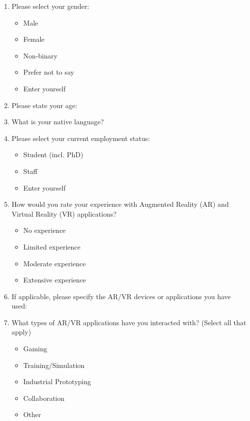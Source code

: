 \begin{enumerate}
    \item Please select your gender:
    \begin{itemize}
        \item Male
        \item Female
        \item Non-binary
        \item Prefer not to say
        \item Enter yourself
    \end{itemize}
    
    \item Please state your age: \underline{\hspace{3cm}}
    
    \item What is your native language? \underline{\hspace{5cm}}
    
    \item Please select your current employment status:
    \begin{itemize}
        \item Student (incl. PhD)
        \item Staff
        \item Enter yourself
    \end{itemize}
    
    \item How would you rate your experience with Augmented Reality (AR) and Virtual Reality (VR) applications?
    \begin{itemize}
        \item No experience
        \item Limited experience
        \item Moderate experience
        \item Extensive experience
    \end{itemize}
    
    \item If applicable, please specify the AR/VR devices or applications you have used: \underline{\hspace{8cm}}
    
    \item What types of AR/VR applications have you interacted with? (Select all that apply)
    \begin{itemize}
        \item Gaming
        \item Training/Simulation
        \item Industrial Prototyping
        \item Collaboration
        \item Other
    \end{itemize}
    

\end{enumerate}
